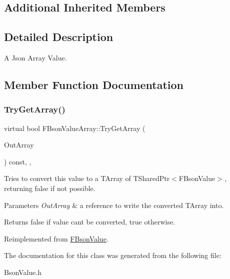 \subsection*{Additional Inherited Members}


\subsection{Detailed Description}
A Json Array Value. 

\subsection{Member Function Documentation}
\mbox{\label{class_f_bson_value_array_a32f100ae460cd26a870fc04d85ffe2c5}} 
\subsubsection{\texorpdfstring{Try\+Get\+Array()}{TryGetArray()}}
{\footnotesize\ttfamily virtual bool F\+Bson\+Value\+Array\+::\+Try\+Get\+Array (\begin{DoxyParamCaption}\item[{const T\+Array$<$ T\+Shared\+Ptr$<$ \mbox{\hyperlink{class_f_bson_value}{F\+Bson\+Value}} $>$$>$ $\ast$\&}]{Out\+Array }\end{DoxyParamCaption}) const\hspace{0.3cm}{\ttfamily [inline]}, {\ttfamily [override]}, {\ttfamily [virtual]}}

Tries to convert this value to a T\+Array of T\+Shared\+Ptr$<$\+F\+Bson\+Value$>$, returning false if not possible.


\begin{DoxyParams}{Parameters}
{\em Out\+Array} & a reference to write the converted T\+Array into. \\
\hline
\end{DoxyParams}
\begin{DoxyReturn}{Returns}
false if value can\textquotesingle{}t be converted, true otherwise. 
\end{DoxyReturn}


Reimplemented from \mbox{\hyperlink{class_f_bson_value_a80102a8570ea5468895c82f1bc480151}{F\+Bson\+Value}}.



The documentation for this class was generated from the following file\+:\begin{DoxyCompactItemize}
\item 
Bson\+Value.\+h\end{DoxyCompactItemize}
